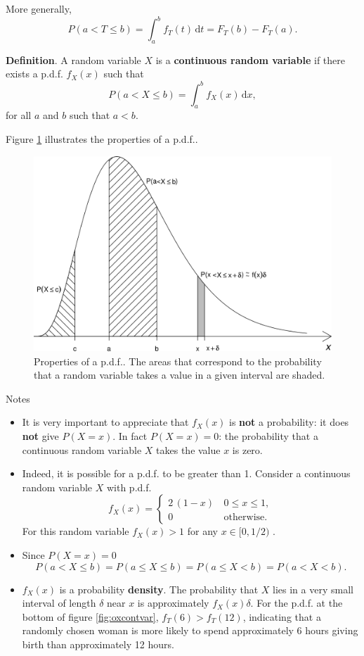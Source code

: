\documentclass[
  british,
]{book}
\providecommand{\tightlist}{%
  \setlength{\itemsep}{0pt}\setlength{\parskip}{0pt}}
\begin{document}
More generally,
\[ P(a < T \leq b) = \displaystyle\int_a^b f_T(t) \,\mathrm{d}t = F_T(b)-F_T(a). \]

\textbf{Definition}. A random variable \(X\) is a \textbf{continuous random variable} if there exists a p.d.f. \(f_X(x)\) such that
\[
P(a < X \leq b) = \int_{a}^{b} f_X(x) \,\mathrm{d}x,
\]
for all \(a\) and \(b\) such that \(a < b\).

Figure \ref{fig:pdfshady} illustrates the properties of a p.d.f..

\begin{figure}

{\centering \includegraphics[width=0.8\linewidth]{images/pdf_shady} 

}

\caption{Properties of a p.d.f.. The areas that correspond to the probability that a random variable takes a value in a given interval are shaded.}\label{fig:pdfshady}
\end{figure}
\FloatBarrier

Notes

\begin{itemize}
\tightlist
\item
  It is very important to appreciate that \(f_X(x)\) is \textbf{not} a probability: it does \textbf{not} give \(P(X=x)\). In fact \(P(X=x)=0\): the probability that a continuous random variable \(X\) takes the value \(x\) is zero.
\item
  Indeed, it is possible for a p.d.f. to be greater than 1. Consider a continuous random variable \(X\) with p.d.f.
  \[ f_X(x) = \left\{ \begin{array}{ll} 2\,(1-x) & \,0 \leq x \leq 1, \\ 0 & \,\mbox{otherwise}.\end{array}\right. \]
  For this random variable \(f_X(x)>1\) for any \(x \in [0, 1/2)\) .
\item
  Since \(P(X=x)=0\)
  \[ P(a < X \leq b) = P(a \leq X \leq b) = P(a \leq X < b) = P(a < X < b). \]
\item
  \(f_X(x)\) is a probability \textbf{density}. The probability that \(X\) lies in a very small interval of length \(\delta\) near \(x\) is approximately \(f_X(x) \delta\). For the p.d.f. at the bottom of figure \ref{fig:oxcontvar}, \(f_T(6) > f_T(12)\), indicating that a randomly chosen woman is more likely to spend approximately 6 hours giving birth than approximately
  12 hours.
\end{itemize}
\end{document}
